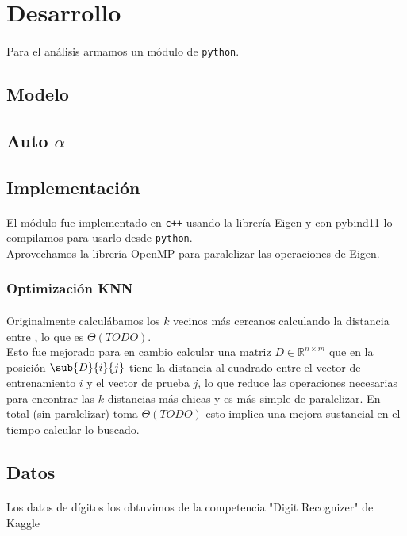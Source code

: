 \documentclass[../main.tex]{subfiles}
\begin{document}
\section{Desarrollo} 
\label{sec:desarrollo}

\paragraph{} Para el análisis armamos un módulo de \texttt{python}.

\subsection{Modelo}
\label{sec:desarrollo.modelo}

\subsection{Auto \(\alpha\)}
\label{sec:desarrollo.auto}

\subsection{Implementación}
\label{sec:desarrollo.implementación}

\paragraph{} El módulo fue implementado en \texttt{c++} usando la librería Eigen y con pybind11 lo compilamos para usarlo desde \texttt{python}. \\
Aprovechamos la librería OpenMP para paralelizar las operaciones de Eigen.

\subsubsection{Optimización KNN}
\label{sec:desarrollo.opt_knn}

\paragraph{} Originalmente calculábamos los \(k\) vecinos más cercanos calculando la distancia entre , lo que es \(\Theta(TODO)\). \\
Esto fue mejorado para en cambio calcular una matriz \(D \in \mathbb{R}^{n \times m}\) que en la posición \(\sub{D}{i}{j}\) tiene la distancia al cuadrado entre el vector de entrenamiento \(i\) y el vector de prueba \(j\), lo que reduce las operaciones necesarias para encontrar las \(k\) distancias más chicas y es más simple de paralelizar. En total (sin paralelizar) toma \(\Theta(TODO)\) esto implica una mejora sustancial en el tiempo calcular lo buscado.


\subsection{Datos}

\paragraph{} Los datos de dígitos los obtuvimos de la competencia "Digit Recognizer" de Kaggle
\end{document}
